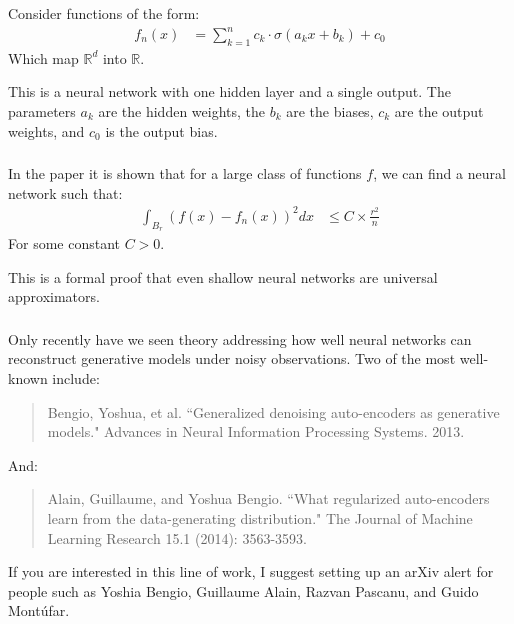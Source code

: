 \documentclass[xetex,mathserif,serif,aspectratio=169]{beamer}
\begin{document}
\begin{frame}[fragile] \frametitle{} \oldB \small

Consider functions of the form:
\begin{align*}
f_n(x) &= \sum_{k=1}^n c_k \cdot \sigma(a_k x + b_k) + c_0
\end{align*}
Which map $\mathbb{R}^d$ into $\mathbb{R}$.

This is a neural network with one hidden layer and a
single output. The parameters $a_k$ are the hidden weights,
the $b_k$ are the biases, $c_k$ are the output weights, and
$c_0$ is the output bias.

\end{frame}

\begin{frame}[fragile] \frametitle{} \oldB \small

In the paper it is shown that for a large class of
functions $f$, we can find a neural network such
that:
\begin{align*}
\int_{B_r} (f(x) - f_n(x))^2 dx &\leq C \times \frac{r^2}{n}
\end{align*}
For some constant $C > 0$.

This is a formal proof that even shallow neural networks are
universal approximators.

\end{frame}

\begin{frame}[fragile] \frametitle{} \oldB \small

Only recently have we seen theory addressing how well neural
networks can reconstruct generative models under noisy
observations. Two of the most well-known include:
\begin{quote}
Bengio, Yoshua, et al. ``Generalized denoising auto-encoders as generative models." Advances in Neural Information Processing Systems. 2013.
\end{quote}
And:
\begin{quote}
Alain, Guillaume, and Yoshua Bengio. ``What regularized auto-encoders learn from the data-generating distribution." The Journal of Machine Learning Research 15.1 (2014): 3563-3593.
\end{quote}
If you are interested in this line of work, I suggest setting
up an arXiv alert for people such as Yoshia Bengio, Guillaume Alain,
Razvan Pascanu, and Guido Mont\'{u}far.

\end{frame}
\end{document}
